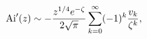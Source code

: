 \[\mathop{\mathrm{Ai}\/}\nolimits'\!\left(z\right)\sim-\frac{z^{1/4}e^{-\zeta}}{%
2\sqrt{\pi}}\sum_{k=0}^{\infty}(-1)^{k}\frac{v_{k}}{\zeta^{k}},\]